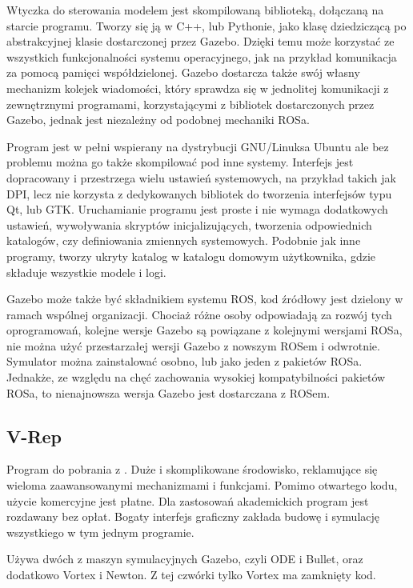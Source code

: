 		Wtyczka do sterowania modelem jest skompilowaną biblioteką, dołączaną na starcie programu.
		Tworzy się ją w C++, lub Pythonie, jako klasę dziedziczącą po abstrakcyjnej klasie dostarczonej przez Gazebo.
		Dzięki temu może korzystać ze wszystkich funkcjonalności systemu operacyjnego, jak na przykład komunikacja za pomocą pamięci współdzielonej.
		Gazebo dostarcza także swój własny mechanizm kolejek wiadomości, który sprawdza się w jednolitej komunikacji z zewnętrznymi programami, korzystającymi z bibliotek 
		dostarczonych przez Gazebo, jednak jest niezależny od podobnej mechaniki ROSa.

		Program jest w pełni wspierany na dystrybucji GNU/Linuksa Ubuntu ale bez problemu można go także skompilować pod inne systemy.
		Interfejs jest dopracowany i przestrzega wielu ustawień systemowych, na przykład takich jak DPI, lecz nie korzysta z dedykowanych bibliotek do tworzenia 
		interfejsów typu Qt, lub GTK.
		Uruchamianie programu jest proste i nie wymaga dodatkowych ustawień, wywoływania skryptów inicjalizujących, 
		tworzenia odpowiednich katalogów, czy definiowania zmiennych systemowych.
		Podobnie jak inne programy, tworzy ukryty katalog w katalogu domowym użytkownika, gdzie składuje wszystkie modele i logi.

		Gazebo może także być składnikiem systemu ROS, kod źródłowy jest dzielony w ramach wspólnej organizacji.
		Chociaż różne osoby odpowiadają za rozwój tych oprogramowań,
		kolejne wersje Gazebo są powiązane z kolejnymi wersjami ROSa, nie można użyć przestarzałej wersji Gazebo z nowszym ROSem i odwrotnie.
		Symulator można zainstalować osobno, lub jako jeden z pakietów ROSa.
		Jednakże, ze względu na chęć zachowania wysokiej kompatybilności pakietów ROSa, to nienajnowsza wersja Gazebo jest dostarczana z ROSem.

	\subsection{V-Rep}
		Program do pobrania z \cite{vrep_website}. Duże i skomplikowane środowisko, reklamujące się wieloma zaawansowanymi mechanizmami i funkcjami.
		Pomimo otwartego kodu, użycie komercyjne jest płatne. Dla zastosowań akademickich program jest rozdawany bez opłat.
		Bogaty interfejs graficzny zakłada budowę i symulację wszystkiego w tym jednym programie.

		Używa dwóch z maszyn symulacyjnych Gazebo, czyli ODE i Bullet, oraz dodatkowo Vortex i Newton. Z tej czwórki tylko Vortex ma zamknięty kod.

